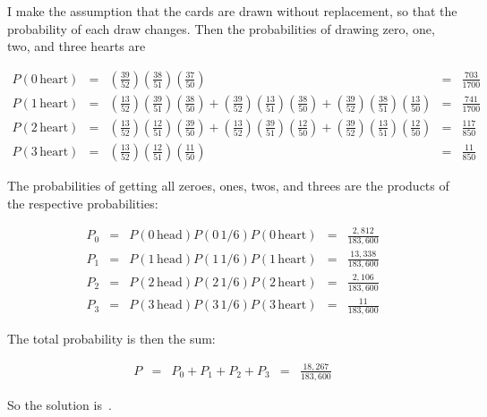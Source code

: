 \documentclass{article}
\begin{document}
I make the assumption that the cards are drawn without replacement, so that the probability of each draw changes.
Then the probabilities of drawing zero, one, two, and three hearts are

\[
\begin{matrix}
P(0\,\mathrm{heart})
  &=& \left(\frac{39}{52}\right)\left(\frac{38}{51}\right)\left(\frac{37}{50}\right)
  &=& \frac{703}{1700} \\
P(1\,\mathrm{heart})
  &=& \left(\frac{13}{52}\right)\left(\frac{39}{51}\right)\left(\frac{38}{50}\right)
  + \left(\frac{39}{52}\right)\left(\frac{13}{51}\right)\left(\frac{38}{50}\right)
  + \left(\frac{39}{52}\right)\left(\frac{38}{51}\right)\left(\frac{13}{50}\right)
  &=& \frac{741}{1700} \\
P(2\,\mathrm{heart})
  &=& \left(\frac{13}{52}\right)\left(\frac{12}{51}\right)\left(\frac{39}{50}\right)
  + \left(\frac{13}{52}\right)\left(\frac{39}{51}\right)\left(\frac{12}{50}\right)
  + \left(\frac{39}{52}\right)\left(\frac{13}{51}\right)\left(\frac{12}{50}\right)
  &=& \frac{117}{850} \\
P(3\,\mathrm{heart})
  &=& \left(\frac{13}{52}\right)\left(\frac{12}{51}\right)\left(\frac{11}{50}\right)
  &=& \frac{11}{850}
\end{matrix}
\]

The probabilities of getting all zeroes, ones, twos, and threes are the products of the respective probabilities:

\[
\begin{matrix}
P_{0} &=& P(0\,\mathrm{head})P(0\,1/6)P(0\,\mathrm{heart})
  &=& \frac{2,812}{183,600} \\
P_{1} &=& P(1\,\mathrm{head})P(1\,1/6)P(1\,\mathrm{heart})
  &=& \frac{13,338}{183,600} \\
P_{2} &=& P(2\,\mathrm{head})P(2\,1/6)P(2\,\mathrm{heart})
  &=& \frac{2,106}{183,600} \\
P_{3} &=& P(3\,\mathrm{head})P(3\,1/6)P(3\,\mathrm{heart})
  &=& \frac{11}{183,600}
\end{matrix}
\]

The total probability is then the sum:

\[
\begin{matrix}
P &=& P_{0} + P_{1} + P_{2}+ P_{3} &=& \frac{18,267}{183,600}
\end{matrix}
\]

So the solution is \,.
\end{document}
